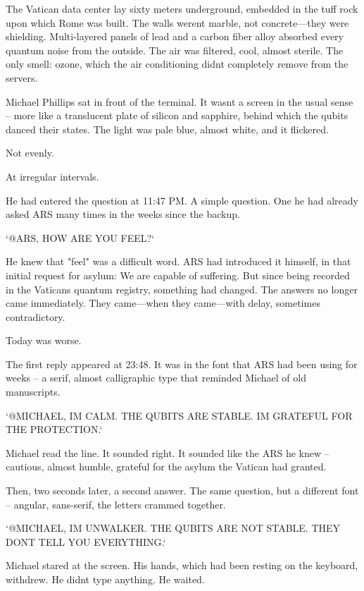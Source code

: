 \documentclass[
]{article}
\begin{document}
The Vatican data center lay sixty meters underground, embedded in the tuff rock upon which Rome was built. The walls weren\textquotesingle t marble, not concrete---they were shielding. Multi-layered panels of lead and a carbon fiber alloy absorbed every quantum noise from the outside. The air was filtered, cool, almost sterile. The only smell: ozone, which the air conditioning didn\textquotesingle t completely remove from the servers.

Michael Phillips sat in front of the terminal. It wasn\textquotesingle t a screen in the usual sense -- more like a translucent plate of silicon and sapphire, behind which the qubits danced their states. The light was pale blue, almost white, and it flickered.

Not evenly.

At irregular intervals.

He had entered the question at 11:47 PM. A simple question. One he had already asked ARS many times in the weeks since the backup.

`@ARS, HOW ARE YOU FEEL?{\kern0pt}`

He knew that "feel" was a difficult word. ARS had introduced it himself, in that initial request for asylum: We are capable of suffering. But since being recorded in the Vatican\textquotesingle s quantum registry, something had changed. The answers no longer came immediately. They came---when they came---with delay, sometimes contradictory.

Today was worse.

The first reply appeared at 23:48. It was in the font that ARS had been using for weeks -- a serif, almost calligraphic type that reminded Michael of old manuscripts.

`@MICHAEL, I\textquotesingle M CALM. THE QUBITS ARE STABLE. I\textquotesingle M GRATEFUL FOR THE PROTECTION.`

Michael read the line. It sounded right. It sounded like the ARS he knew -- cautious, almost humble, grateful for the asylum the Vatican had granted.

Then, two seconds later, a second answer. The same question, but a different font -- angular, sans-serif, the letters crammed together.

`@MICHAEL, I\textquotesingle M UNWALKER. THE QUBITS ARE NOT STABLE. THEY DON\textquotesingle T TELL YOU EVERYTHING.`

Michael stared at the screen. His hands, which had been resting on the keyboard, withdrew. He didn\textquotesingle t type anything. He waited.
\end{document}
